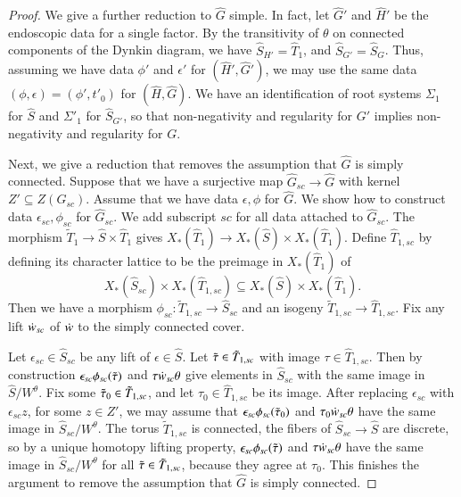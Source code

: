 \begin{proof}
We give a further reduction to  $\hat G$ simple.
In fact, let $\hat G'$ and $\hat H'$ be the endoscopic data for a single factor.  By the transitivity of $\theta$ on connected
components of the Dynkin diagram, we have $\hat S_{H'} = \hat T_1$, and $\hat S_{G'} = \hat S_{G}$.  Thus, assuming we have
data $\phi'$ and $\epsilon'$ for $(\hat H',\hat G')$, we may use the same data $(\phi,\epsilon)=(\phi',t'_0)$ for $(\hat H,\hat G)$.
We have an identification of root systems $\Sigma_1$ for $\hat S$ and $\Sigma'_1$ for $\hat S_{G'}$, so that non-negativity and regularity
for $G'$ implies non-negativity and regularity for $G$.

Next, we give a reduction that removes the assumption that $\hat G$ is simply connected.   Suppose that we have a surjective map 
$\hat G_{sc}\to \hat G$ with kernel $Z' \subseteq Z(G_{sc})$.   Assume that we have data $\epsilon,\phi$ for $\hat G$.
We show how to construct data $\epsilon_{sc},\phi_{sc}$ for $\hat G_{sc}$.   We add subscript ${sc}$ for all data attached to $\hat G_{sc}$.
The morphism $\tilde T_1 \to \hat S\times \hat T_1$ gives $X_*(\hat T_1)\to X_*(\hat S)\times X_*(\hat T_1)$.  Define $\hat T_{1,sc}$ by
defining its character lattice to be the preimage in $X_*(\hat T_1)$ of 
\[
X_*(\hat S_{sc})\times X_*(\hat T_{1, sc}) \subseteq X_*(\hat S)\times X_*(\hat T_1).
\]  Then we have a morphism
$\phi_{sc}:\tilde T_{1,sc}\to\hat S_{sc}$ and an isogeny $\tilde T_{1,sc} \to \hat T_{1,sc}$.  Fix any lift $\dot w_{sc}$ of $\dot w$ to the simply
connected cover.

Let $\epsilon_{sc}\in \hat S_{sc}$ be any lift of $\epsilon\in \hat S$.  Let $\tilde\tau\in \tilde T_{1,sc}$ with image $\tau\in \hat T_{1,sc}$.
Then by construction $\epsilon_{sc}\phi_{sc}(\tilde\tau)$ and $\tau\dot w_{sc}\theta$ give elements in $\hat S_{sc}$ with the same
image in $\hat S/W^\theta$.    Fix some $\tilde\tau_0\in \tilde T_{1,sc}$, and let $\tau_0\in \hat T_{1,sc}$ be its image.  
After replacing $\epsilon_{sc}$ with $\epsilon_{sc} z$, for some $z\in Z'$,
we may assume that $\epsilon_{sc}\phi_{sc}(\tilde\tau_0)$ and $\tau_0\dot w_{sc}\theta$ have the same image in $\hat S_{sc}/W^\theta$.   The torus
$\tilde T_{1,sc}$ is connected, the fibers of $\hat S_{sc}\to \hat S$ are discrete, so by a unique homotopy lifting property, 
$\epsilon_{sc}\phi_{sc}(\tilde\tau)$ and $\tau\dot w_{sc}\theta$ have the same image in $\hat S_{sc}/W^\theta$ for all $\tilde\tau\in\tilde T_{1,sc}$, because they agree at $\tau_0$.
This finishes the argument to remove the assumption that $\hat G$ is simply connected.


\end{proof}
